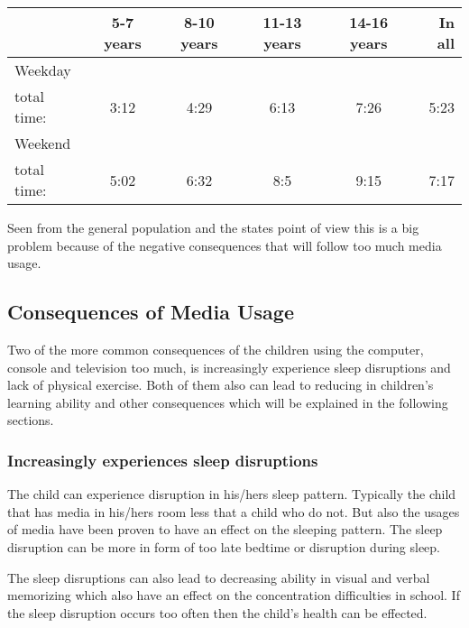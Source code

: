 
\begin{table}
\begin{center}
  \begin{tabular}{ | l | c | c | c | c || r | }
    \hline
				& 5-7 years & 8-10 years & 11-13 years & 14-16 years & In all\\ \hline
    Weekday 	&  		    &  			 &  		   &   			 & \\ 
	total time:  &	3:12	& 4:29		 &  6:13	   &  7:26		 & 5:23  \\ \hline
	Weekend &  &  &  &   & \\
	total time: &  	5:02	&  6:32		&  8:5		   &	9:15	& 7:17 \\ \hline
    \hline
  \end{tabular}
  \label{tab:Gallup2012screentime}
\end{center}
\end{table}

Seen from the general population and the states point of view this is a big problem because of the negative consequences that will follow 
too much media usage. 

\subsection{Consequences of Media Usage}
Two of the more common consequences of the children using the computer, console and television too much, is increasingly experience sleep disruptions 
and lack of physical exercise. Both of them also can lead to reducing in children's learning ability and other consequences which will be 
explained in the following sections.

 
\subsubsection*{Increasingly experiences sleep disruptions}
The child can experience disruption in his/hers sleep pattern. Typically the child that has media in his/hers room less that a child who do not. 
But also the usages of media have been proven to have an effect on the sleeping pattern. The sleep disruption can be more in form of too late bedtime
or disruption during sleep.

The sleep disruptions can also lead to decreasing ability in visual and verbal memorizing which also have an effect on the
concentration difficulties in school. If the sleep disruption occurs too often then the child's health can be effected.



